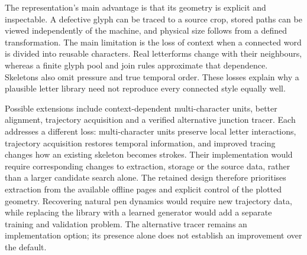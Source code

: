 The representation's main advantage is that its geometry is explicit and inspectable. A defective glyph can be traced to a source crop, stored paths can be viewed independently of the machine, and physical size follows from a defined transformation. The main limitation is the loss of context when a connected word is divided into reusable characters. Real letterforms change with their neighbours, whereas a finite glyph pool and join rules approximate that dependence. Skeletons also omit pressure and true temporal order. These losses explain why a plausible letter library need not reproduce every connected style equally well.~\cite[style.py; synthesise.py; reproduce.py]{braunepipeline2026}

Possible extensions include context-dependent multi-character units, better alignment, trajectory acquisition and a verified alternative junction tracer. Each addresses a different loss: multi-character units preserve local letter interactions, trajectory acquisition restores temporal information, and improved tracing changes how an existing skeleton becomes strokes. Their implementation would require corresponding changes to extraction, storage or the source data, rather than a larger candidate search alone.
The retained design therefore prioritises extraction from the available offline pages and explicit control of the plotted geometry. Recovering natural pen dynamics would require new trajectory data, while replacing the library with a learned generator would add a separate training and validation problem. The alternative tracer remains an implementation option; its presence alone does not establish an improvement over the default.~\cite[style.py; synthesise.py; reproduce.py]{braunepipeline2026}
\FloatBarrier
